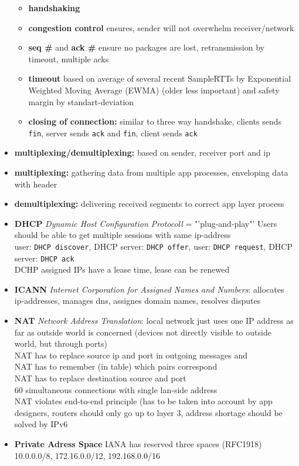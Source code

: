 \begin{itemize}
\begin{itemize}
    \item \textbf{handshaking}
    \item \textbf{congestion control} ensures, sender will not overwhelm receiver/network
    \item \textbf{seq \#} and \textbf{ack \#} ensure no packages are lost, retransmission by timeout, multiple acks
    \item \textbf{timeout} based on average of several recent SampleRTTs by Exponential Weighted Moving Average (EWMA) (older less important) and safety margin by standart-deviation
    \item \textbf{closing of connection:} similar to three way handshake, clients sends \texttt{fin}, server sends \texttt{ack} and \texttt{fin}, client sends \texttt{ack}
   \end{itemize}
  \item \textbf{multiplexing/demultiplexing:} based on sender, receiver port and ip
  \item \textbf{multiplexing:} gathering data from multiple app processes, enveloping data with header
  \item \textbf{demultiplexing:} delivering received segments to correct app layer process
  \item \textbf{DHCP} \textit{Dynamic Host Configuration Protocoll} = "'plug-and-play"' Users should be able to get multiple sessions with same ip-address \\
  user: \texttt{DHCP discover}, DHCP server: \texttt{DHCP offer}, user: \texttt{DHCP request}, DHCP server: \texttt{DHCP ack} \\
  DCHP assigned IPs have a lease time, lease can be renewed
  \item \textbf{ICANN} \textit{Internet Corporation for Assigned Names and Numbers}: allocates ip-addresses, manages dns, assignes domain names, resolves disputes
  \item \textbf{NAT} \textit{Network Address Translation}: local network just uses one IP address as far as outside world is concerned (devices not directly visible to outside world, but through ports)\\
  NAT has to replace source ip and port in outgoing messages and \\
  NAT has to remember (in table) which pairs correspond \\
  NAT has to replace destination source and port\\
  60 simultaneous connections with single lan-side address \\
  NAT violates end-to-end principle (has to be taken into account by app designers, routers should only go up to layer 3, address shortage should be solved by IPv6
  \item \textbf{Private Adress Space} IANA has reserved three spaces (RFC1918) 10.0.0.0/8, 172.16.0.0/12, 192.168.0.0/16
 \end{itemize}
 
